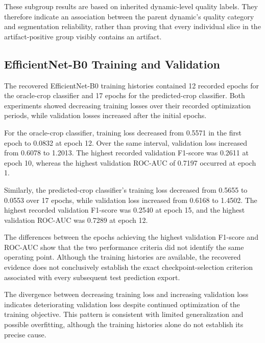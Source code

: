 These subgroup results are based on inherited dynamic-level quality labels. They therefore indicate an association between the parent dynamic's quality category and segmentation reliability, rather than proving that every individual slice in the artifact-positive group visibly contains an artifact.

\subsection{EfficientNet-B0 Training and Validation}
\label{sec:results_2d_classification}
\label{subsec:results_2d_classification_training}

The recovered EfficientNet-B0 training histories contained 12 recorded epochs for the oracle-crop classifier and 17 epochs for the predicted-crop classifier. Both experiments showed decreasing training losses over their recorded optimization periods, while validation losses increased after the initial epochs.

For the oracle-crop classifier, training loss decreased from 0.5571 in the first epoch to 0.0832 at epoch 12. Over the same interval, validation loss increased from 0.6078 to 1.2013. The highest recorded validation F1-score was 0.2611 at epoch 10, whereas the highest validation ROC-AUC of 0.7197 occurred at epoch 1.

Similarly, the predicted-crop classifier's training loss decreased from 0.5655 to 0.0553 over 17 epochs, while validation loss increased from 0.6168 to 1.4502. The highest recorded validation F1-score was 0.2540 at epoch 15, and the highest validation ROC-AUC was 0.7289 at epoch 12.

The differences between the epochs achieving the highest validation F1-score and ROC-AUC show that the two performance criteria did not identify the same operating point. Although the training histories are available, the recovered evidence does not conclusively establish the exact checkpoint-selection criterion associated with every subsequent test prediction export.

The divergence between decreasing training loss and increasing validation loss indicates deteriorating validation loss despite continued optimization of the training objective. This pattern is consistent with limited generalization and possible overfitting, although the training histories alone do not establish its precise cause.


